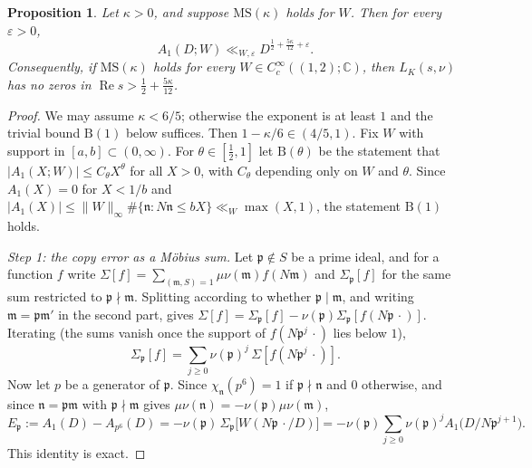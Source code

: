 \documentclass[11pt]{article}
\newtheorem{proposition}{Proposition}
\theoremstyle{remark}
\begin{document}
\begin{proposition}\label{prop:cond}
Let $\kappa>0$, and suppose $\mathrm{MS}(\kappa)$ holds for $W$. Then for every
$\varepsilon>0$,
\[
A_1(D;W)\ll_{W,\varepsilon}D^{\frac12+\frac{5\kappa}{12}+\varepsilon}.
\]
Consequently, if $\mathrm{MS}(\kappa)$ holds for every $W\in C_c^\infty((1,2);\mathbb C)$,
then $L_K(s,\nu)$ has no zeros in $\operatorname{Re}s>\frac12+\frac{5\kappa}{12}$.
\end{proposition}

\begin{proof}
We may assume $\kappa<6/5$; otherwise the exponent is at least $1$ and the trivial bound
$\mathrm B(1)$ below suffices. Then $1-\kappa/6\in(4/5,1)$.
Fix $W$ with support in $[a,b]\subset(0,\infty)$. For $\theta\in[\frac12,1]$ let
$\mathrm B(\theta)$ be the statement that $|A_1(X;W)|\le C_\theta X^\theta$ for all $X>0$,
with $C_\theta$ depending only on $W$ and $\theta$. Since $A_1(X)=0$ for $X<1/b$ and
$|A_1(X)|\le\|W\|_\infty\#\{\mathfrak n:N\mathfrak n\le bX\}\ll_W\max(X,1)$, the statement
$\mathrm B(1)$ holds.

\emph{Step 1: the copy error as a Möbius sum.} Let $\mathfrak p\notin S$ be a prime ideal,
and for a function $f$ write $\Sigma[f]=\sum_{(\mathfrak m,S)=1}\mu\nu(\mathfrak m)f(N\mathfrak m)$
and $\Sigma_{\mathfrak p}[f]$ for the same sum restricted to $\mathfrak p\nmid\mathfrak m$.
Splitting according to whether $\mathfrak p\mid\mathfrak m$, and writing
$\mathfrak m=\mathfrak p\mathfrak m'$ in the second part, gives
$\Sigma[f]=\Sigma_{\mathfrak p}[f]-\nu(\mathfrak p)\Sigma_{\mathfrak p}[f(N\mathfrak p\,\cdot)]$.
Iterating (the sums vanish once the support of $f(N\mathfrak p^j\,\cdot)$ lies below $1$),
\[
\Sigma_{\mathfrak p}[f]=\sum_{j\ge0}\nu(\mathfrak p)^j\,\Sigma[f(N\mathfrak p^j\,\cdot)].
\]
Now let $p$ be a generator of $\mathfrak p$. Since $\chi_{\mathfrak n}(p^6)=1$ if
$\mathfrak p\nmid\mathfrak n$ and $0$ otherwise, and since $\mathfrak n=\mathfrak p\mathfrak m$
with $\mathfrak p\nmid\mathfrak m$ gives $\mu\nu(\mathfrak n)=-\nu(\mathfrak p)\mu\nu(\mathfrak m)$,
\[
E_{\mathfrak p}:=A_1(D)-A_{p^6}(D)
=-\nu(\mathfrak p)\,\Sigma_{\mathfrak p}\big[W(N\mathfrak p\,\cdot/D)\big]
=-\nu(\mathfrak p)\sum_{j\ge0}\nu(\mathfrak p)^j A_1\big(D/N\mathfrak p^{j+1}\big).
\]
This identity is exact.


\end{proof}
\end{document}
